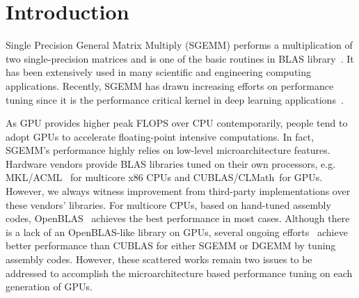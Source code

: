 \section{Introduction}
Single Precision General Matrix Multiply (SGEMM) performs a multiplication of two single-precision matrices and is one 
of the basic routines in BLAS library~\cite{blas}. It has been extensively used in many scientific and engineering 
computing applications. Recently, SGEMM has drawn increasing efforts on performance tuning since it is the performance 
critical kernel in deep learning applications~\cite{chetlur2014cudnn,nervana_sgemm_wiki}.

As GPU provides higher peak FLOPS over CPU contemporarily, people tend to adopt GPUs to accelerate
floating-point intensive computations. In fact, SGEMM's performance highly relies on low-level microarchitecture 
features. Hardware
vendors provide BLAS libraries tuned on their own processors, e.g. MKL/ACML~\cite{intel2007intel,amd2014} for multicore 
x86 CPUs and CUBLAS/CLMath~\cite{nvidia2008cublas, clmath}for
GPUs. However, we always witness improvement from third-party implementations over these vendors' libraries. For
multicore CPUs, based on hand-tuned assembly codes, OpenBLAS~\cite{xianyi2012openblas} achieves the best performance in 
most cases.
Although there is a lack of an OpenBLAS-like library on GPUs, several ongoing efforts~\cite{tan,lai,nervana_sgemm_wiki,
chien, volkov} achieve better performance than CUBLAS for either SGEMM or DGEMM by tuning assembly codes. However, 
these scattered works remain two issues to be addressed to accomplish the microarchitecture based performance tuning on 
each generation of GPUs.

